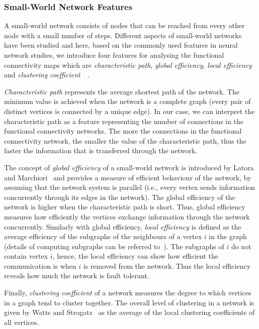 \subsubsection{Small-World Network Features}
A small-world network consists of nodes that can be reached from every other node with a small number of steps. Different aspects of small-world networks have been studied and here, based on the commonly used features in neural network studies, we introduce four features for analysing the functional connectivity maps which are \emph{characteristic path}, \emph{global efficiency}, \emph{local efficiency} and \emph{clustering coefficient}~\cite{watts1998collective}~\cite{latora2001efficient}.

\emph{Characteristic path} represents the average shortest path of the network. The minimum value is achieved when the network is a complete graph (every pair of distinct vertices is connected by a unique edge). In our case, we can interpret the characteristic path as a feature representing the number of connections in the functional connectivity networks. The more the connections in the functional connectivity network, the smaller the value of the characteristic path, thus the faster the information that is transferred through the network. 

The concept of \emph{global efficiency} of a small-world network is introduced by Latora and Marchiori~\cite{latora2001efficient} and provides a measure of efficient behaviour of the network, by assuming that the network system is parallel (i.e., every vertex sends information concurrently through its edges in the network). The global efficiency of the network is higher when the characteristic path is short. Thus, global efficiency measures how efficiently the vertices exchange information through the network concurrently. Similarly with global efficiency, \emph{local efficiency} is defined as the average efficiency of the subgraphs of the neighbours of a vertex $i$ in the graph (details of computing subgraphs can be referred to~\cite{ullmann1976algorithm}). The subgraphs of $i$ do not contain vertex $i$, hence, the local efficiency can show how efficient the communication is when $i$ is removed from the network. Thus the local efficiency reveals how much the network is fault tolerant. 

Finally, \emph{clustering coefficient} of a network measures the degree to which vertices in a graph tend to cluster together. The overall level of clustering in a network is given by Watts and Strogatz~\cite{watts1998collective} as the average of the local clustering coefficients of all vertices. 

